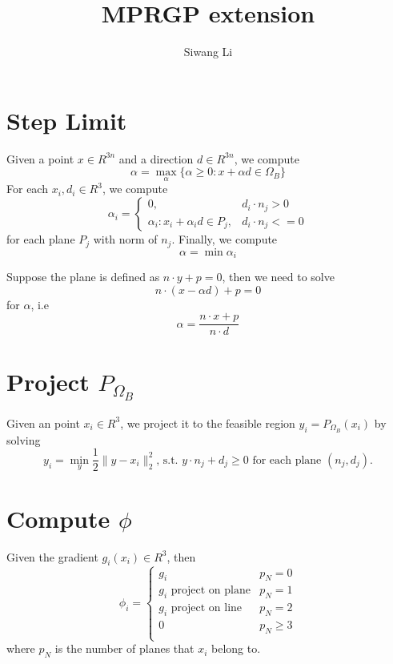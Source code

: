 \documentclass[9pt,twocolumn]{extarticle}
\author{Siwang Li}
\title{MPRGP extension}
\begin{document}
\maketitle

\setlength{\parskip}{0.5ex}

\section{Step Limit}
Given a point $x\in R^{3n}$ and a direction $d\in R^{3n}$, we compute 
\begin{equation} 
  \alpha = \max_{\alpha}\{\alpha\ge 0: x+\alpha d\in \Omega_B\}
\end{equation}
For each $x_i,d_i\in R^3$, we compute
\begin{equation}
  \alpha_i=\left\{ \begin{array}{rl}
      0, & d_i\cdot n_j > 0\\
      \alpha_i:x_i+\alpha_id \in P_j, & d_i\cdot n_j <= 0
    \end{array} \right.
\end{equation}
for each plane $P_j$ with norm of $n_j$. Finally, we compute
\begin{equation} 
  \alpha = \min \alpha_i
\end{equation}

Suppose the plane is defined as $n\cdot y + p = 0$, then we need to solve 
\begin{equation}
  n\cdot(x-\alpha d)+p = 0
\end{equation}
for $\alpha$, i.e
\begin{equation}
  \alpha = \frac{n\cdot x+p}{n\cdot d}
\end{equation}

\section{Project $P_{\Omega_B}$}
Given an point $x_i\in R^3$, we project it to the feasible region $y_i=P_{\Omega_B}(x_i)$ by solving
\begin{equation} 
  y_i = \min_{y} \frac{1}{2}\|y-x_i\|_2^2 \mbox{, s.t. }y \cdot n_j + d_j \ge 0 \mbox{ for each plane }(n_j,d_j).
\end{equation}

\section{Compute $\phi$}
Given the gradient $g_i(x_i)\in R^3$, then
\begin{equation}
  \phi_i = \left\{ \begin{array}{rl}
     g_i & p_N = 0\\
     g_i \mbox{ project on plane} & p_N = 1\\
     g_i \mbox{ project on line}& p_N = 2\\
     0 & p_N \ge 3\\
    \end{array} \right.
\end{equation}
where $p_N$ is the number of planes that $x_i$ belong to.
\end{document}
